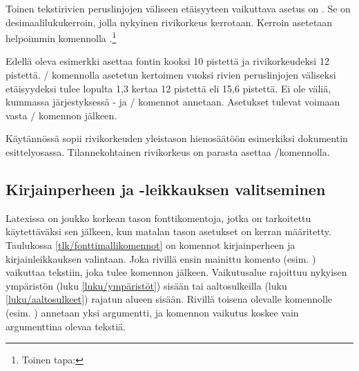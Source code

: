 Toinen tekstirivien peruslinjojen väliseen etäisyyteen vaikuttava asetus
on . Se on desimaalilukukerroin, jolla nykyinen
rivikorkeus kerrotaan. Kerroin asetetaan helpoimmin komennolla
.\footnote{Toinen tapa: }

\begin{koodilohkosis}
\fontsize{10bp}{12bp} \linespread{1.3} \selectfont
\end{koodilohkosis}

\noindent
Edellä oleva esimerkki asettaa fontin kooksi 10 pistettä ja
rivikorkeudeksi 12 pistettä. \-/ komennolla asetetun
kertoimen vuoksi rivien peruslinjojen väliseksi etäisyydeksi tulee
lopulta 1,3 kertaa 12 pistettä eli 15,6 pistettä. Ei ole väliä, kummassa
järjestyksessä - ja \-/ komennot
annetaan. Asetukset tulevat voimaan vasta \-/
komennon jälkeen.

Käytännössä  sopii rivikorkeuden yleistason
hienosäätöön esimerkiksi dokumentin esittelyosassa. Tilannekohtainen
rivikorkeus on parasta asettaa \-/komennolla.

\subsection{Kirjainperheen ja -leikkauksen valitseminen}
\label{luku/fontit-korkea}

Latexissa on joukko korkean tason fonttikomentoja, jotka on tarkoitettu
käytettäväksi sen jälkeen, kun matalan tason asetukset on kerran
määritetty. Taulukossa \ref{tlk/fonttimallikomennot} on komennot
kirjainperheen ja kirjainleikkauksen valintaan. Joka rivillä ensin
mainittu komento (esim. ) vaikuttaa tekstiin, joka
tulee komennon jälkeen. Vaikutusalue rajoittuu nykyisen ympäristön (luku
\ref{luku/ympäristöt}) sisään tai aaltosulkeilla (luku
\ref{luku/aaltosulkeet}) rajatun alueen sisään. Rivillä toisena olevalle
komennolle (esim. ) annetaan yksi argumentti, ja
komennon vaikutus koskee vain argumenttina olevaa tekstiä.

